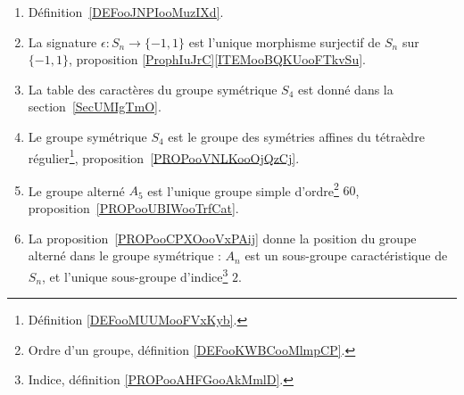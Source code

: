        \label{THEMEooQEEWooXDhvhv}

\begin{enumerate}
	\item
	      Définition~\ref{DEFooJNPIooMuzIXd}.
	\item
	      La signature \( \epsilon\colon S_n\to \{ -1,1 \}\) est l'unique morphisme surjectif de \( S_n\) sur \( \{ -1,1 \}\), proposition \ref{ProphIuJrC}\ref{ITEMooBQKUooFTkvSu}.
	\item
	      La table des caractères du groupe symétrique \( S_4\) est donné dans la section~\ref{SecUMIgTmO}.
	\item
	      Le groupe symétrique \( S_4\) est le groupe des symétries affines du tétraèdre régulier\footnote{Définition \ref{DEFooMUUMooFVxKyb}.}, proposition~\ref{PROPooVNLKooOjQzCj}.
	\item
	      Le groupe alterné \( A_5\) est l'unique groupe simple d'ordre\footnote{Ordre d'un groupe, définition \ref{DEFooKWBCooMlmpCP}.} \( 60\), proposition~\ref{PROPooUBIWooTrfCat}.
	\item
	      La proposition~\ref{PROPooCPXOooVxPAij} donne la position du groupe alterné dans le groupe symétrique : \( A_n\) est un sous-groupe caractéristique de \( S_n\), et l'unique sous-groupe d'indice\footnote{Indice, définition \ref{PROPooAHFGooAkMmlD}.} \( 2\).
\end{enumerate}
